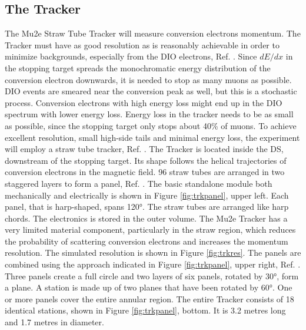 \subsection{The Tracker}\label{trackersec}
The Mu2e Straw Tube Tracker will measure conversion electrons momentum.
The Tracker must have as good resolution as is reasonably achievable
in order to minimize backgrounds, especially from the DIO electrons, Ref. \cite{bobbb}.
Since $dE/dx$ in the stopping target spreads the 
monochromatic energy distribution of the conversion electron downwards, 
it is needed to stop as many muons as possible. DIO events are smeared near the conversion 
peak as well, but this is a stochastic process. Conversion electrons with high energy loss 
might end up in the DIO spectrum with lower energy loss. Energy loss in the tracker needs 
to be as small as possible, since the stopping target only stops about 40\% of muons. 
To achieve excellent resolution, small high-side tails and minimal energy loss, the experiment 
will employ a straw tube tracker, Ref. \cite{bobbb}.
The Tracker is located inside the DS, downstream of the stopping target. 
Its shape follows the helical trajectories of conversion electrons 
in the magnetic field. 96 straw tubes are arranged in 
two staggered layers to form a panel, Ref. \cite{bartoszek2015mu2e}. 
The basic standalone module both mechanically and electrically is 
shown in Figure \ref{fig:trkpanel}, upper left. Each panel, that is 
harp-shaped, spans 120°. The straw tubes are arranged like harp chords. 
The electronics is stored in the outer volume. The Mu2e Tracker has a 
very limited material component, particularly in the straw region, 
which reduces the probability of scattering conversion electrons 
and increases the momentum resolution. The simulated resolution is shown in Figure \ref{fig:trkres}. 
The panels are combined 
using the approach indicated in Figure \ref{fig:trkpanel}, upper right, 
Ref. \cite{trk}. Three panels create a full circle and two layers of six 
panels, rotated by 30°, form a plane. A station is made up of two planes 
that have been rotated by 60°. One or more panels cover the entire annular 
region. The entire Tracker consists of 18 identical stations, shown in 
Figure \ref{fig:trkpanel}, bottom. It is 3.2 metres long and 1.7 metres in diameter. 
